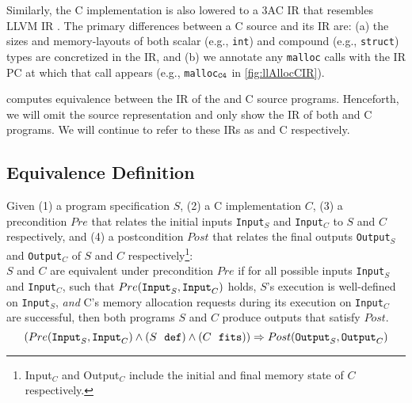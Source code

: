Similarly, the C implementation is also lowered to a 3AC IR
that resembles LLVM IR \cite{llvm_langref_home}. The primary differences between a C
source and its IR are: (a) the sizes and
memory-layouts of both scalar (e.g., {\tt int}) and
compound (e.g., {\tt struct}) types are concretized in the IR,
and (b) we annotate any {\tt malloc} calls with
the IR PC at which that call appears
(e.g., {\tt malloc$_{\tt C4}$} in \cref{fig:llAllocCIR}).

\toolName{} computes equivalence between the IR
of the \SpecL{} and C source programs.
Henceforth, we will omit the source
representation and only show the IR of
both \SpecL{} and C programs.
We will continue to refer to these IRs
as \SpecL{} and C respectively.

\subsection{Equivalence Definition}
\label{sec:eqdef}
Given (1) a \SpecL{} program specification $S$, (2) a C implementation
$C$,
(3) a precondition $Pre$ that
relates the initial inputs {\tt Input}$_S$
and {\tt Input}$_C$ to
$S$ and $C$ respectively, and (4) a postcondition
$Post$ that relates the final outputs {\tt Output}$_S$
and {\tt Output}$_C$ of $S$ and $C$ respectively\footnote{{Input}$_C$ and {Output}$_C$ include the initial and final memory state of $C$ respectively.}:\\
$S$ and $C$ are equivalent under precondition $Pre$ if
for all possible inputs {\tt Input}$_S$
and {\tt Input}$_C$,
such that $Pre(\mathrm{\tt Input}_S, \mathrm{\tt Input}_C)$
holds,
$S$'s execution is
well-defined on {\tt Input}$_S$, {\em and} C's
memory allocation requests during its execution on
{\tt Input$_C$} are successful,
then both programs $S$ and $C$ produce outputs
that satisfy $Post$.
$$
(Pre(\mathrm{\tt Input}_S, \mathrm{\tt Input}_C) \land (S\ \  \mathrm{\tt def}) \land (C\ \ \mathrm{\tt fits})) \Rightarrow Post(\mathrm{\tt Output}_S, \mathrm{\tt Output}_C)
$$

